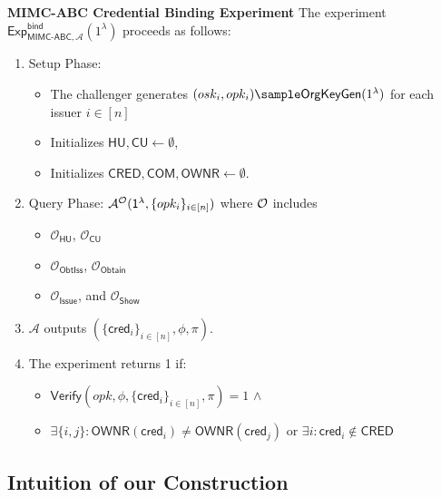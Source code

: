 \noindent \textbf{MIMC-ABC Credential Binding Experiment} The experiment $\mathsf{Exp}^{\mathsf{bind}}_{\mathsf{MIMC\mbox{-}ABC},\mathcal{A}}(1^\lambda)$ proceeds as follows:
\begin{enumerate}
    \item Setup Phase:
    \begin{itemize}
        \item The challenger generates $(osk_i, opk_i) \sample \mathsf{OrgKeyGen}(1^\lambda)$ for each issuer $i \in [n]$
        \item Initializes $\mathsf{HU, CU} \gets \emptyset$, 
        \item Initializes $\mathsf{CRED, COM, OWNR} \gets \emptyset$. 
    \end{itemize}

    \item Query Phase: $\mathcal{A}^{\mathcal{O}}(\mathsf{1^{\lambda}}, \{opk_i\}_{i \in [n]})$ where $\mathcal{O}$ includes 
    \begin{itemize}
        \item $\mathcal{O}_{\mathsf{HU}}$, $\mathcal{O}_{\mathsf{CU}}$
        \item $\mathcal{O}_{\mathsf{ObtIss}}$, $\mathcal{O}_{\mathsf{Obtain}}$
        \item $\mathcal{O}_{\mathsf{Issue}}$, and $\mathcal{O}_{\mathsf{Show}}$
    \end{itemize}

    \item $\mathcal{A}$ outputs $(\{\mathsf{cred}_i\}_{i \in [n]}, \phi, \pi)$. 
    \item The experiment returns 1 if:
    \begin{itemize}
        \item $\mathsf{Verify}(opk, \phi, \{\mathsf{cred}_i\}_{i \in [n]}, \pi) = 1$ $\wedge$
        \item $\exists \{i,j\}: \mathsf{OWNR}(\mathsf{cred}_i) \neq \mathsf{OWNR}(\mathsf{cred}_j)$ or $\exists i: \mathsf{cred}_i \notin \mathsf{CRED}$
    \end{itemize}
\end{enumerate}










\newpage
\subsection{Intuition of our Construction}
